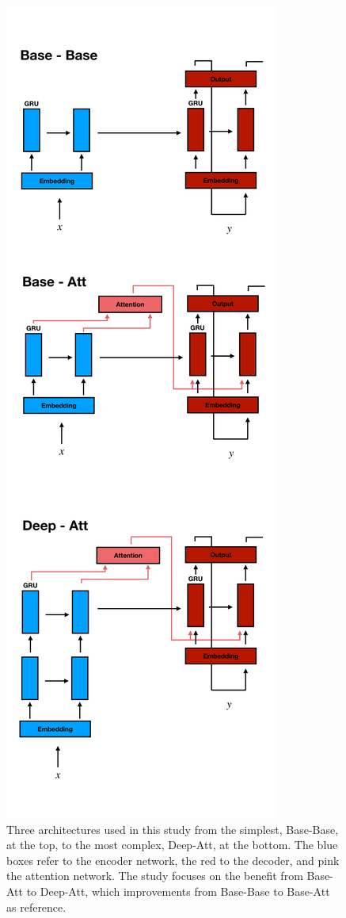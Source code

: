 \documentclass[twocolumn,superscriptaddress]{revtex4-1}
\begin{document}
\begin{figure}
\includegraphics[scale = 0.15]{../plots/architecture.pdf}
\caption{
Three architectures used in this study from the simplest, Base-Base, at the top, to the most complex, Deep-Att, at the bottom.
The blue boxes refer to the encoder network, the red to the decoder, and pink the attention network.
The study focuses on the benefit from Base-Att to Deep-Att, which improvements from Base-Base to Base-Att as reference.
} 
\label{fig:architectures}
\end{figure}
\end{document}
